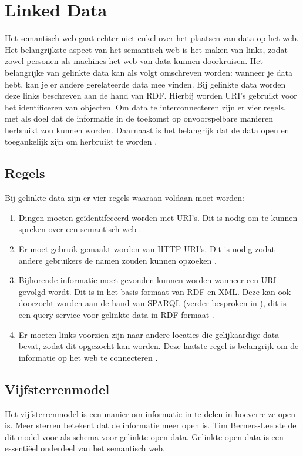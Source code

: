 \section{Linked Data}
\label{sec:linked_data}

Het semantisch web gaat echter niet enkel over het plaatsen van data op het web. Het belangrijkste aspect van het semantisch web is het maken van links, zodat zowel personen als machines het web van data kunnen doorkruisen. Het belangrijke van gelinkte data kan als volgt omschreven worden: wanneer je data hebt, kan je er andere gerelateerde data mee vinden. Bij gelinkte data worden deze links beschreven aan de hand van RDF. Hierbij worden URI's gebruikt voor het identificeren van objecten. Om data te interconnecteren zijn er vier regels, met als doel dat de informatie in de toekomst op onvoorspelbare manieren herbruikt zou kunnen worden. Daarnaast is het belangrijk dat de data open en toegankelijk zijn om herbruikt te worden \cite{berners2006linkeddata}. 

\subsection{Regels}
Bij gelinkte data zijn er vier regels waaraan voldaan moet worden:
\begin{enumerate}
    \item Dingen moeten geïdentifeceerd worden met URI's. Dit is nodig om te kunnen spreken over een semantisch web \cite{berners2006linkeddata}. 
    \item Er moet gebruik gemaakt worden van HTTP URI's. Dit is nodig zodat andere gebruikers de namen zouden kunnen opzoeken \cite{berners2006linkeddata}. 
    \item Bijhorende informatie moet gevonden kunnen worden wanneer een URI gevolgd wordt. Dit is in het basis formaat van RDF en XML. Deze kan ook doorzocht worden aan de hand van SPARQL (verder besproken in ), dit is een query service voor gelinkte data in RDF formaat \cite{berners2006linkeddata}. 
    \item Er moeten links voorzien zijn naar andere locaties die gelijkaardige data bevat, zodat dit opgezocht kan worden. Deze laatste regel is belangrijk om de informatie op het web te connecteren \cite{berners2006linkeddata}.
\end{enumerate}

\subsection{Vijfsterrenmodel}
Het vijfsterrenmodel is een manier om informatie in te delen in hoeverre ze open is. Meer sterren betekent dat de informatie meer open is. Tim Berners-Lee stelde dit model voor als schema voor gelinkte open data. Gelinkte open data is een essentiëel onderdeel van het semantisch web.

